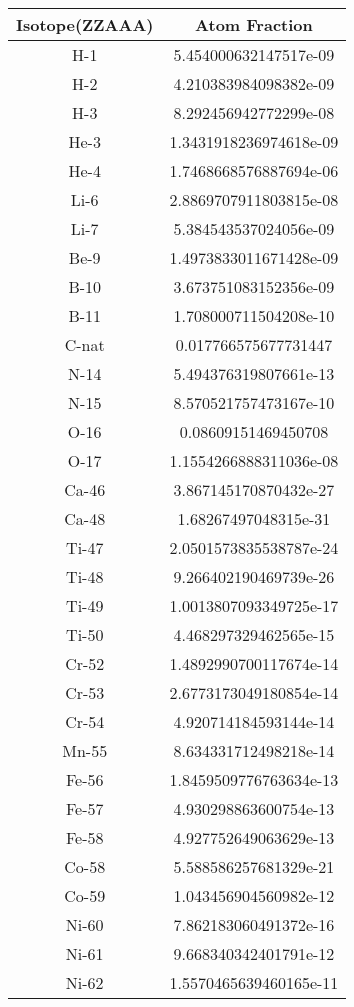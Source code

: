 \begin{table}[h!]
\centering
\begin{tabular}{|| c || c |}
\hline
Isotope(ZZAAA) & Atom Fraction \\
\hline \hline

H-1 & 5.454000632147517e-09 \\
H-2 & 4.210383984098382e-09 \\
H-3 & 8.292456942772299e-08 \\
He-3 & 1.3431918236974618e-09 \\
He-4 & 1.7468668576887694e-06 \\
Li-6 & 2.8869707911803815e-08 \\
Li-7 & 5.384543537024056e-09 \\
Be-9 & 1.4973833011671428e-09 \\
B-10 & 3.673751083152356e-09 \\
B-11 & 1.708000711504208e-10 \\
C-nat & 0.017766575677731447 \\
N-14 & 5.494376319807661e-13 \\
N-15 & 8.570521757473167e-10 \\
O-16 & 0.08609151469450708 \\
O-17 & 1.1554266888311036e-08 \\
Ca-46 & 3.867145170870432e-27 \\
Ca-48 & 1.68267497048315e-31 \\
Ti-47 & 2.0501573835538787e-24 \\
Ti-48 & 9.266402190469739e-26 \\
Ti-49 & 1.0013807093349725e-17 \\
Ti-50 & 4.468297329462565e-15 \\
Cr-52 & 1.4892990700117674e-14 \\
Cr-53 & 2.6773173049180854e-14 \\
Cr-54 & 4.920714184593144e-14 \\
Mn-55 & 8.634331712498218e-14 \\
Fe-56 & 1.8459509776763634e-13 \\
Fe-57 & 4.930298863600754e-13 \\
Fe-58 & 4.927752649063629e-13 \\
Co-58 & 5.588586257681329e-21 \\
Co-59 & 1.043456904560982e-12 \\
Ni-60 & 7.862183060491372e-16 \\
Ni-61 & 9.668340342401791e-12 \\
Ni-62 & 1.5570465639460165e-11 \\

\end{tabular}
\end{table}
